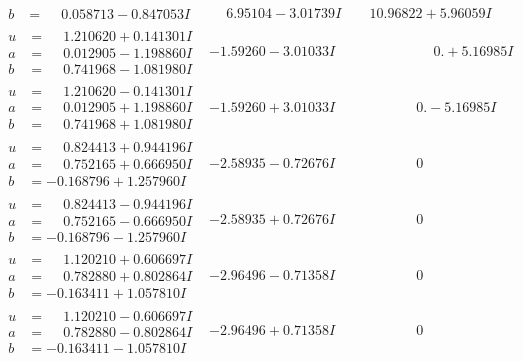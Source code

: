 \documentclass[1p]{elsarticle_modified}
\theoremstyle{definition}
\begin{document}
$$\begin{array}{c|c|c}
\begin{aligned}
b &= \phantom{-}0.058713 - 0.847053 I\end{aligned}
 & \phantom{-}6.95104 - 3.01739 I & \phantom{-}10.96822 + 5.96059 I \\ \hline\begin{aligned}
u &= \phantom{-}1.210620 + 0.141301 I \\
a &= \phantom{-}0.012905 - 1.198860 I \\
b &= \phantom{-}0.741968 - 1.081980 I\end{aligned}
 & -1.59260 - 3.01033 I & \phantom{-0.000000 -}0. + 5.16985 I \\ \hline\begin{aligned}
u &= \phantom{-}1.210620 - 0.141301 I \\
a &= \phantom{-}0.012905 + 1.198860 I \\
b &= \phantom{-}0.741968 + 1.081980 I\end{aligned}
 & -1.59260 + 3.01033 I & \phantom{-0.000000 } 0. - 5.16985 I \\ \hline\begin{aligned}
u &= \phantom{-}0.824413 + 0.944196 I \\
a &= \phantom{-}0.752165 + 0.666950 I \\
b &= -0.168796 + 1.257960 I\end{aligned}
 & -2.58935 - 0.72676 I & \phantom{-0.000000 } 0 \\ \hline\begin{aligned}
u &= \phantom{-}0.824413 - 0.944196 I \\
a &= \phantom{-}0.752165 - 0.666950 I \\
b &= -0.168796 - 1.257960 I\end{aligned}
 & -2.58935 + 0.72676 I & \phantom{-0.000000 } 0 \\ \hline\begin{aligned}
u &= \phantom{-}1.120210 + 0.606697 I \\
a &= \phantom{-}0.782880 + 0.802864 I \\
b &= -0.163411 + 1.057810 I\end{aligned}
 & -2.96496 - 0.71358 I & \phantom{-0.000000 } 0 \\ \hline\begin{aligned}
u &= \phantom{-}1.120210 - 0.606697 I \\
a &= \phantom{-}0.782880 - 0.802864 I \\
b &= -0.163411 - 1.057810 I\end{aligned}
 & -2.96496 + 0.71358 I & \phantom{-0.000000 } 0 \\ \hline\begin{aligned}

\end{aligned}
\end{array}$$
\end{document}
